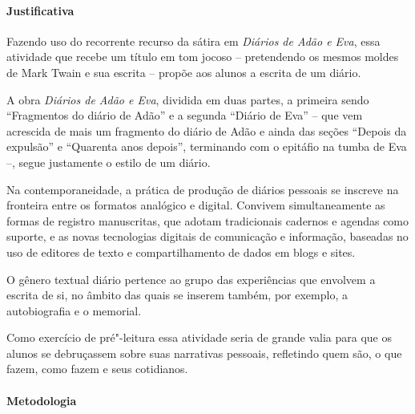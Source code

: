 \documentclass[12pt]{extarticle}
\begin{document}
\paragraph{Justificativa} Fazendo uso do recorrente recurso da sátira em 
\emph{Diários de Adão e Eva}, essa atividade que recebe um título em tom jocoso -- 
pretendendo os mesmos moldes de Mark Twain e sua escrita -- propõe aos alunos a 
escrita de um diário. 

A obra \emph{Diários de Adão e Eva}, dividida em duas partes, a primeira sendo 
``Fragmentos do diário de Adão'' e a segunda ``Diário de Eva'' --
que vem acrescida de mais um fragmento do diário de Adão
e ainda das seções ``Depois da expulsão'' e ``Quarenta anos
depois'', terminando com o epitáfio na tumba de Eva --, segue justamente o estilo 
de um diário.

Na contemporaneidade, a prática de produção de diários pessoais se inscreve 
na fronteira entre os formatos analógico e digital. Convivem simultaneamente 
as formas de registro manuscritas, que adotam tradicionais cadernos e agendas 
como suporte, e as novas tecnologias digitais de comunicação e informação,
baseadas no uso de editores de texto e compartilhamento de dados em
blogs e sites.

O gênero textual diário pertence ao grupo das experiências que envolvem
a escrita de si, no âmbito das quais se inserem também, por exemplo, a
autobiografia e o memorial.

Como exercício de pré"-leitura essa atividade seria de grande valia para 
que os alunos se debruçassem sobre suas narrativas pessoais, refletindo quem 
são, o que fazem, como fazem e seus cotidianos. 

\paragraph{Metodologia}
\end{document}
